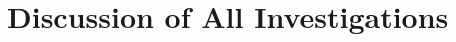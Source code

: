 % 
% 



\DIFdelbegin %
\DIFdelend \DIFaddbegin \section{Discussion of All Investigations}
\DIFaddend \label{chap3:glob_discussion}

